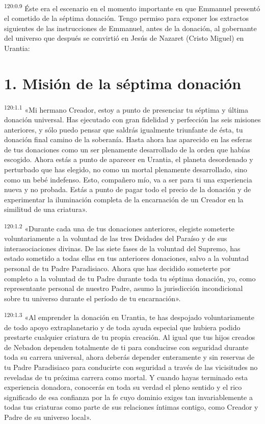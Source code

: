 \par
\textsuperscript{120:0.9} Éste era el escenario en el momento importante en que Emmanuel presentó el cometido de la séptima donación. Tengo permiso para exponer los extractos siguientes de las instrucciones de Emmanuel, antes de la donación, al gobernante del universo que después se convirtió en Jesús de Nazaret (Cristo Miguel) en Urantia:

\section*{1. Misión de la séptima donación}
\par
\textsuperscript{120:1.1} «Mi hermano Creador, estoy a punto de presenciar tu séptima y última donación universal. Has ejecutado con gran fidelidad y perfección las seis misiones anteriores, y sólo puedo pensar que saldrás igualmente triunfante de ésta, tu donación final camino de la soberanía. Hasta ahora has aparecido en las esferas de tus donaciones como un ser plenamente desarrollado de la orden que habías escogido. Ahora estás a punto de aparecer en Urantia, el planeta desordenado y perturbado que has elegido, no como un mortal plenamente desarrollado, sino como un bebé indefenso. Esto, compañero mío, va a ser para ti una experiencia nueva y no probada. Estás a punto de pagar todo el precio de la donación y de experimentar la iluminación completa de la encarnación de un Creador en la similitud de una criatura».

\par
\textsuperscript{120:1.2} «Durante cada una de tus donaciones anteriores, elegiste someterte voluntariamente a la voluntad de las tres Deidades del Paraíso y de sus interasociaciones divinas. De las siete fases de la voluntad del Supremo, has estado sometido a todas ellas en tus anteriores donaciones, salvo a la voluntad personal de tu Padre Paradisiaco. Ahora que has decidido someterte por completo a la voluntad de tu Padre durante toda tu séptima donación, yo, como representante personal de nuestro Padre, asumo la jurisdicción incondicional sobre tu universo durante el período de tu encarnación».

\par
\textsuperscript{120:1.3} «Al emprender la donación en Urantia, te has despojado voluntariamente de todo apoyo extraplanetario y de toda ayuda especial que hubiera podido prestarte cualquier criatura de tu propia creación. Al igual que tus hijos creados de Nebadon dependen totalmente de ti para conducirse con seguridad durante toda su carrera universal, ahora deberás depender enteramente y sin reservas de tu Padre Paradisiaco para conducirte con seguridad a través de las vicisitudes no reveladas de tu próxima carrera como mortal. Y cuando hayas terminado esta experiencia donadora, conocerás en toda su verdad el pleno sentido y el rico significado de esa confianza por la fe cuyo dominio exiges tan invariablemente a todas tus criaturas como parte de sus relaciones íntimas contigo, como Creador y Padre de su universo local».

